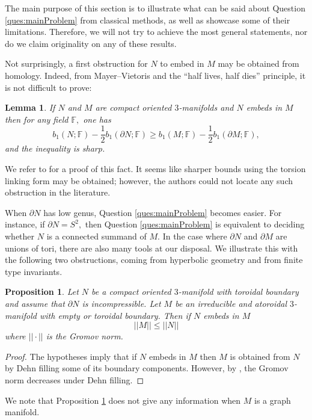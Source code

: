 \documentclass[12pt]{amsart}
\newtheorem{lem}[thm]{Lemma}
\newtheorem{prop}[thm]{Proposition}
\theoremstyle{definition}
\begin{document}
The main purpose of this section is to illustrate what can be said about Question \ref{ques:mainProblem} from classical methods, as well as showcase some of their limitations.
Therefore, we will not try to achieve the most general statements, nor do we claim originality on any of these results. 

Not surprisingly, a first obstruction for $N$ to embed in $M$ may be obtained from homology. Indeed, from Mayer--Vietoris and the ``half lives, half dies'' principle, it is not difficult to prove:

\begin{lem}\label{lem:homolBound}\cite[Thm 1.3]{Ton11}
	If $N$ and $M$ are compact oriented $3$-manifolds and $N$ embeds in $M$ then for any field $\mathbb{F},$ one has
	$$b_1(N;\mathbb{F})-\frac{1}{2}b_1(\partial N;\mathbb{F})\geq b_1(M;\mathbb{F})-\frac{1}{2}b_1(\partial M;\mathbb{F}),$$
	and the inequality is sharp.
\end{lem} 
We refer to \cite[Thm 1.3]{Ton11} for a proof of this fact. It seems like sharper bounds using the torsion linking form may be obtained; however, the authors could not locate any such obstruction in the literature.

\medskip

When $\partial N$ has low genus, Question \ref{ques:mainProblem} becomes easier. For instance, if $\partial N=S^2,$ then Question \ref{ques:mainProblem} is equivalent to deciding whether $N$ is a connected summand of $M.$ In the case where $\partial N$ and $\partial M$ are unions of tori, there are also many tools at our disposal. We illustrate this with the following two obstructions, coming from hyperbolic geometry and from finite type invariants.

\begin{prop}
	\label{prop:GromovNormObs} Let $N$ be a compact oriented $3$-manifold with toroidal boundary and assume that $\partial N$ is incompressible. Let $M$ be an irreducible and atoroidal $3$-manifold with empty or toroidal boundary. Then if $N$ embeds in $M$ 
	$$||M||\leq ||N||$$
	where $||\cdot ||$ is the Gromov norm.
\end{prop}
\begin{proof}
	The hypotheses imply that if $N$ embeds in $M$ then $M$ is obtained from $N$ by Dehn filling some of its boundary components. However, by \cite{Gromov}, the Gromov norm decreases under Dehn filling.
\end{proof}
We note that Proposition \ref{prop:GromovNormObs} does not give any information when $M$ is a graph manifold.
\end{document}
